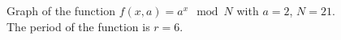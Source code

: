 \begin{figure}
\centering



\caption{Graph of the function $f\left(x, a\right) = a^x \mod{N}$ with $a=2$, $N = 21$. The period of the function is $r=6$.}
\label{picPart4QuantCompShorClassPart}
\end{figure}
